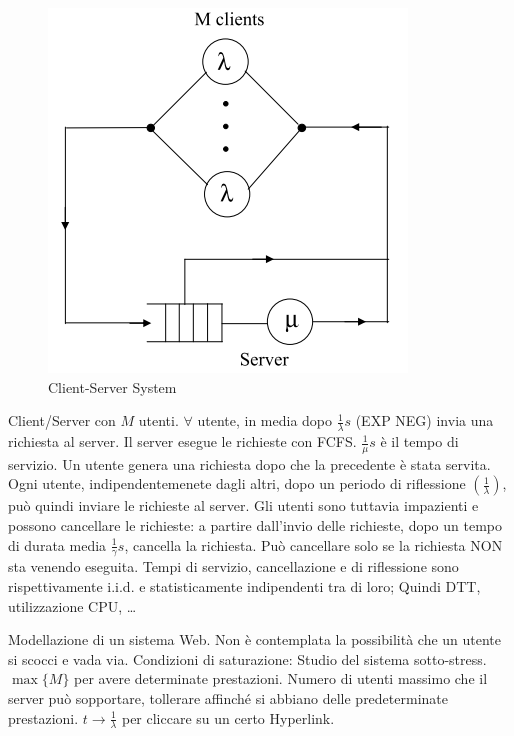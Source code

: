 \begin{figure}[H]
\centering
\includegraphics[scale=1]{figures/ex/cssystem.png}
\caption{Client-Server System}
\end{figure}

Client/Server con $M$ utenti. $\forall$ utente, in media dopo $\frac{1}{\lambda} s$ (EXP NEG) invia una richiesta al server. Il server esegue le richieste con FCFS. $\frac{1}{\mu} s$ è il tempo di servizio. Un utente genera una richiesta dopo che la precedente è stata servita. Ogni utente, indipendentemenete dagli altri, dopo un periodo di riflessione $(\frac{1}{\lambda})$, può quindi inviare le richieste al server. Gli utenti sono tuttavia impazienti e possono cancellare le richieste: a partire dall'invio delle richieste, dopo un tempo di durata media $\frac{1}{\gamma} s$, cancella la richiesta. Può cancellare solo se la richiesta NON sta venendo eseguita. Tempi di servizio, cancellazione e di riflessione sono rispettivamente i.i.d. e statisticamente indipendenti tra di loro; Quindi DTT, utilizzazione CPU, \dots

Modellazione di un sistema Web. Non è contemplata la possibilità che un utente si scocci e vada via. Condizioni di saturazione: Studio del sistema sotto-stress. $\max\{M\}$ per avere determinate prestazioni. Numero di utenti massimo che il server può sopportare, tollerare affinché si abbiano delle predeterminate prestazioni. $t\rightarrow \frac{1}{\lambda}$ per cliccare su un certo Hyperlink. 

